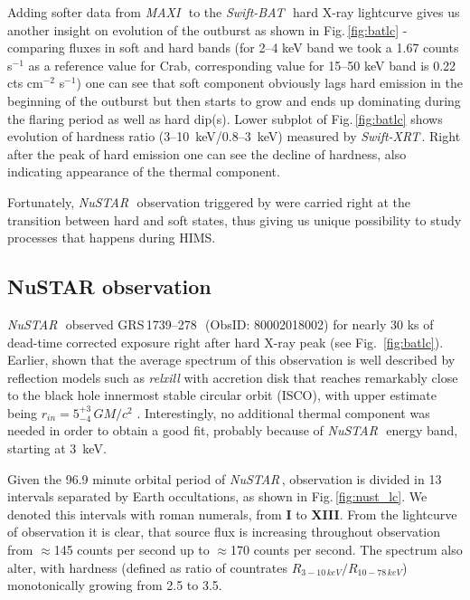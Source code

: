 \documentclass[a4paper,fleqn,usenatbib]{mnras}
\def\grs{{GRS\,1739--278\,}}
\def\swiftx{{\em Swift-XRT\,}}
\def\swiftb{{\em Swift-BAT\,}}
\def\nustar{{\em NuSTAR\,}}
\def\maxi{{\em MAXI\,}}
\begin{document}
Adding softer data from \maxi\, to the \swiftb\, hard X-ray lightcurve gives us another insight on evolution of the outburst as shown in Fig.\,\ref{fig:batlc} - comparing fluxes in soft and hard bands (for 2--4 keV band we took a 1.67 counts s$^{-1}$ as a reference value for Crab, corresponding value for 15--50 keV band is 0.22 cts cm$^{-2}$ s$^{-1}$) one can see that soft component obviously lags hard emission in the beginning of the outburst but then starts to grow and ends up dominating during the flaring period as well as hard dip(s). 
Lower subplot of Fig.\,\ref{fig:batlc} shows evolution of hardness ratio (3--10~keV/0.8--3~keV) measured by \swiftx. 
Right after the peak of hard emission one can see the decline of hardness, also indicating appearance of the thermal component.

Fortunately, \nustar\ observation triggered by \cite{miller15_nust} were carried right at the transition between hard and soft states, thus giving us unique possibility to study processes that happens during HIMS. 

\subsection{NuSTAR observation}
\label{sec:nust} 

\nustar\, observed \grs\ (ObsID: 80002018002) for nearly 30 ks of dead-time corrected exposure right after hard X-ray peak (see Fig.~\ref{fig:batlc}). Earlier, \cite{miller15_nust} shown that the average spectrum of this observation is well described by reflection models such as {\it relxill} \citep{garcia14, dauser14,dauser16} with accretion disk that reaches remarkably close to the black hole innermost stable circular orbit (ISCO), with upper estimate being $r_{in} = 5^{+3}_{-4}\, G M/c^{2}$ \citep{miller15_nust}. Interestingly, no additional thermal component was needed in order to obtain a good fit, probably because of \nustar\, energy band, starting at 3~keV. 

Given the 96.9 minute orbital period of \nustar, observation is divided in 13 intervals separated by Earth occultations, as shown in Fig.\,\ref{fig:nust_lc}. We denoted this intervals with roman numerals, from {\bf I} to {\bf XIII}. From the lightcurve of observation it is clear, that source flux is increasing throughout observation from $\approx$145 counts per second up to $\approx$170 counts per second. 
The spectrum also alter, with hardness (defined as ratio of countrates  $R_{3-10\,keV}/R_{10-78\,keV}$) monotonically growing from 2.5 to 3.5. 
\end{document}
